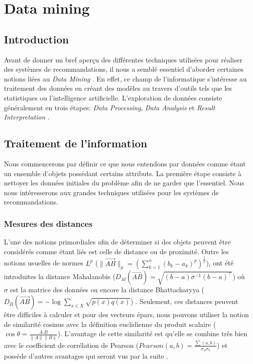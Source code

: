 \section{Data mining}

\subsection{Introduction}

Avant de donner un bref aperçu des différentes techniques utilisées pour réaliser des systèmes de recommandations, il nous a semblé essentiel d'aborder certaines notions liées au \textit{Data Mining} \cite{han2011data}. En effet, ce champ de l'informatique s'intéresse au traitement des données en créant des modèles au travers d'outils tels que les statistiques ou l'intelligence artificielle. L'exploration de données consiste généralement en trois étapes: \textit{Data Processing}, \textit{Data Analysis} et \textit{Result Interpretation} \cite{pyle1999data}.

\subsection{Traitement de l'information} \label{subsec:Data Processing}

Nous commencerons par définir ce que nous entendons par données comme étant un ensemble d'objets possédant certains attributs. La première étape consiste à nettoyer les données initiales du problème afin de ne garder que l'essentiel. Nous nous intéresserons aux grandes techniques utilisées pour les systèmes de recommandations.

\subsubsection{Mesures des distances} \label{subsubsec:Distance Measures}

L'une des notions primordiales afin de déterminer si des objets peuvent être considérés comme étant liés est celle de distance ou de proximité. Outre les notions usuelles de normes $L^{p}$ ($\lVert \overrightarrow{AB} \rVert_{p} = (\sum\limits_{k = 1}^{n} (b_k - a_k)^{p})^{\frac{1}{p}} $), ont été introduites la distance Mahalanobis ($D_{M}(\overrightarrow{AB}) = \sqrt{(b - a) \sigma^{-1} (b - a)^\intercal} $) où $\sigma$ est la matrice des données \cite{mahalanobis1936generalized} ou encore la distance Bhattacharyya ($D_{B}(\overrightarrow{AB}) = -\log{\sum\nolimits_{x \in X} \sqrt{p(x)q(x)}} $) \cite{narendra1977branch}. Seulement, ces distances peuvent être difficiles à calculer et pour des vecteurs épars, nous pouvons utiliser la notion de similarité cosinus avec la définition euclidienne du produit scalaire ($ \cos{\theta} = \frac{A . B}{\lVert A \rVert \lVert B \rVert}$). L'avantage de cette similarité est qu'elle se combine très bien avec le coefficient de corrélation de Pearson ($Pearson(a, b)  = \frac{\sum\nolimits (a, b)}{ \sigma_{a} \sigma_{b}}$) et possède d'autres avantages qui seront vus par la suite \cite{tan2006introduction}.

